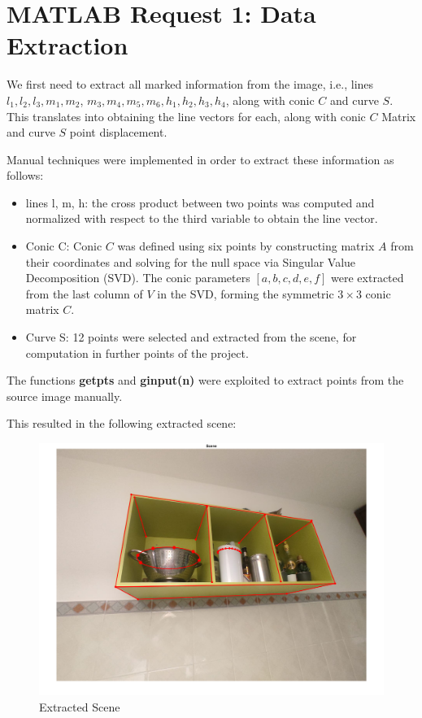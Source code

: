 \documentclass{Configuration_Files/PoliMi3i_thesis}
\begin{document}
\newpage
\section{MATLAB Request 1: Data Extraction}

\noindent
We first need to extract all marked information from the image, i.e., lines \( l_1, l_2, l_3, m_1, m_2\),
\(m_3, m_4, m_5, m_6, h_1, h_2, h_3, h_4 \), along with conic \( C \) and curve \( S \).\\
This translates into obtaining the line vectors for each, along with conic \( C \) Matrix and curve \( S \) point displacement.

Manual techniques were implemented in order to extract these information as follows:
\begin{itemize}
    \item lines l, m, h: the cross product between two points was computed and normalized with respect to the third variable to obtain the line vector.
    \item Conic C: Conic $C$ was defined using six points by constructing matrix $A$ from their coordinates and solving for the null space via Singular Value Decomposition (SVD). The conic parameters $[a, b, c, d, e, f]$ were extracted from the last column of $V$ in the SVD, forming the symmetric $3 \times 3$ conic matrix $C$.
    \item Curve S: 12 points were selected and extracted from the scene, for computation in further points of the project.
\end{itemize}

The functions \textbf{getpts} and \textbf{ginput(n)} were exploited to extract points from the source image manually.

This resulted in the following extracted scene:
\begin{figure}[H]
    \centering
    \includegraphics[width=0.75\linewidth]{Project Template/Images/extracted_scene.png}
    \caption{Extracted Scene}
    \label{fig:enter-label}
\end{figure}
\end{document}
